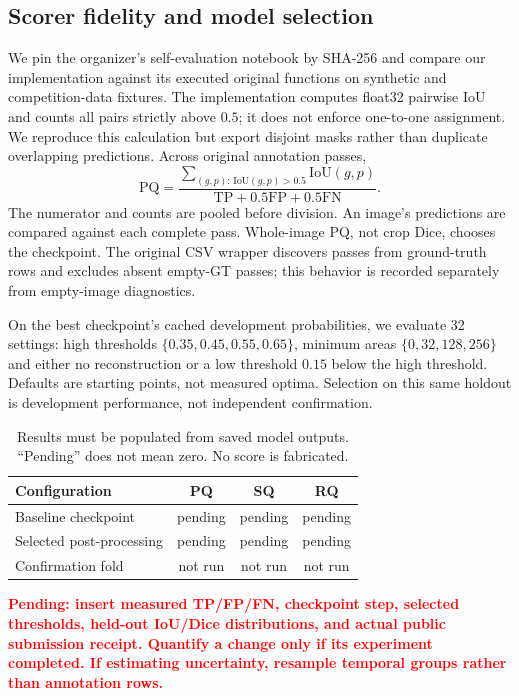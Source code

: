\documentclass[sigconf]{acmart}
\newcommand{\pending}[1]{\textcolor{red}{\textbf{Pending: #1}}}
\begin{document}
\subsection{Scorer fidelity and model selection}
We pin the organizer's self-evaluation notebook by SHA-256 and compare our implementation against its executed original functions on synthetic and competition-data fixtures. The implementation computes float32 pairwise IoU and counts all pairs strictly above $0.5$; it does not enforce one-to-one assignment. We reproduce this calculation but export disjoint masks rather than duplicate overlapping predictions. Across original annotation passes,
\begin{equation}
\mathrm{PQ}=\frac{\sum_{(g,p):\,\mathrm{IoU}(g,p)>0.5}\mathrm{IoU}(g,p)}{\mathrm{TP}+0.5\mathrm{FP}+0.5\mathrm{FN}}.
\end{equation}
The numerator and counts are pooled before division. An image's predictions are compared against each complete pass. Whole-image PQ, not crop Dice, chooses the checkpoint. The original CSV wrapper discovers passes from ground-truth rows and excludes absent empty-GT passes; this behavior is recorded separately from empty-image diagnostics.

On the best checkpoint's cached development probabilities, we evaluate 32 settings: high thresholds $\{0.35,0.45,0.55,0.65\}$, minimum areas $\{0,32,128,256\}$ and either no reconstruction or a low threshold $0.15$ below the high threshold. Defaults are starting points, not measured optima. Selection on this same holdout is development performance, not independent confirmation.

\begin{table}[t]
\centering
\caption{Results must be populated from saved model outputs. ``Pending'' does not mean zero. No score is fabricated.}
\begin{tabular}{lccc}
\toprule
Configuration & PQ & SQ & RQ\\
\midrule
Baseline checkpoint & pending & pending & pending\\
Selected post-processing & pending & pending & pending\\
Confirmation fold & not run & not run & not run\\
\bottomrule
\end{tabular}
\label{tab:results}
\end{table}

\pending{insert measured TP/FP/FN, checkpoint step, selected thresholds, held-out IoU/Dice distributions, and actual public submission receipt. Quantify a change only if its experiment completed. If estimating uncertainty, resample temporal groups rather than annotation rows.}
\end{document}
